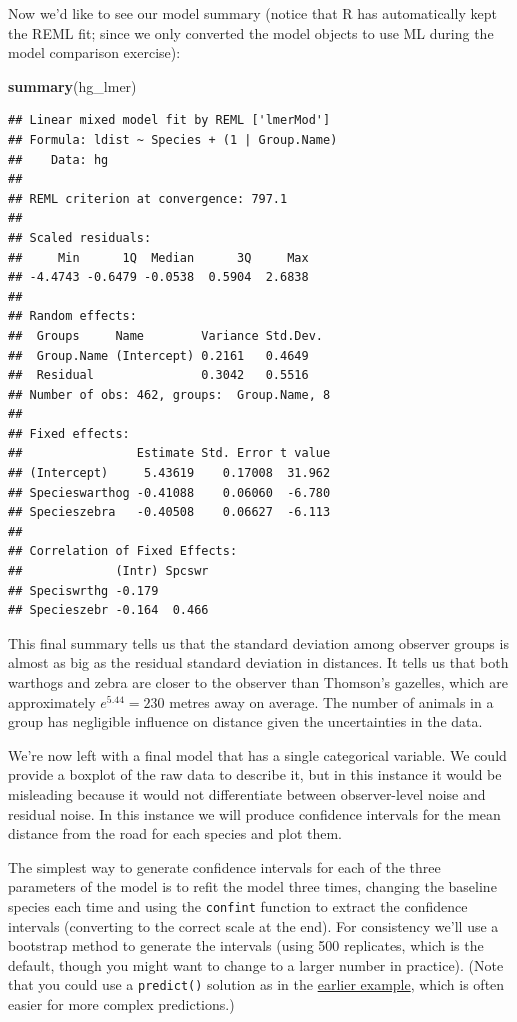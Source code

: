 \documentclass[]{book}
\newenvironment{Shaded}{\begin{snugshade}}{\end{snugshade}}
\newcommand{\KeywordTok}[1]{\textcolor[rgb]{0.13,0.29,0.53}{\textbf{#1}}}
\newcommand{\NormalTok}[1]{#1}
\theoremstyle{definition}
\theoremstyle{definition}
\theoremstyle{definition}
\theoremstyle{remark}
\begin{document}
Now we'd like to see our model summary (notice that R has automatically
kept the REML fit; since we only converted the model objects to use ML
during the model comparison exercise):

\begin{Shaded}
\begin{Highlighting}[]
\KeywordTok{summary}\NormalTok{(hg_lmer)}
\end{Highlighting}
\end{Shaded}

\scriptsize

\begin{verbatim}
## Linear mixed model fit by REML ['lmerMod']
## Formula: ldist ~ Species + (1 | Group.Name)
##    Data: hg
## 
## REML criterion at convergence: 797.1
## 
## Scaled residuals: 
##     Min      1Q  Median      3Q     Max 
## -4.4743 -0.6479 -0.0538  0.5904  2.6838 
## 
## Random effects:
##  Groups     Name        Variance Std.Dev.
##  Group.Name (Intercept) 0.2161   0.4649  
##  Residual               0.3042   0.5516  
## Number of obs: 462, groups:  Group.Name, 8
## 
## Fixed effects:
##                Estimate Std. Error t value
## (Intercept)     5.43619    0.17008  31.962
## Specieswarthog -0.41088    0.06060  -6.780
## Specieszebra   -0.40508    0.06627  -6.113
## 
## Correlation of Fixed Effects:
##             (Intr) Spcswr
## Speciswrthg -0.179       
## Specieszebr -0.164  0.466
\end{verbatim}

\normalsize

This final summary tells us that the standard deviation among observer
groups is almost as big as the residual standard deviation in distances.
It tells us that both warthogs and zebra are closer to the observer than
Thomson's gazelles, which are approximately \(e^{5.44} = 230\) metres
away on average. The number of animals in a group has negligible
influence on distance given the uncertainties in the data.

We're now left with a final model that has a single categorical
variable. We could provide a boxplot of the raw data to describe it, but
in this instance it would be misleading because it would not
differentiate between observer-level noise and residual noise. In this
instance we will produce confidence intervals for the mean distance from
the road for each species and plot them.

The simplest way to generate confidence intervals for each of the three
parameters of the model is to refit the model three times, changing the
baseline species each time and using the \texttt{confint} function to
extract the confidence intervals (converting to the correct scale at the
end). For consistency we'll use a bootstrap method to generate the
intervals (using 500 replicates, which is the default, though you might
want to change to a larger number in practice). (Note that you could use
a \texttt{predict()} solution as in the
\protect\hyperlink{parboot}{earlier example}, which is often easier for
more complex predictions.)
\end{document}

